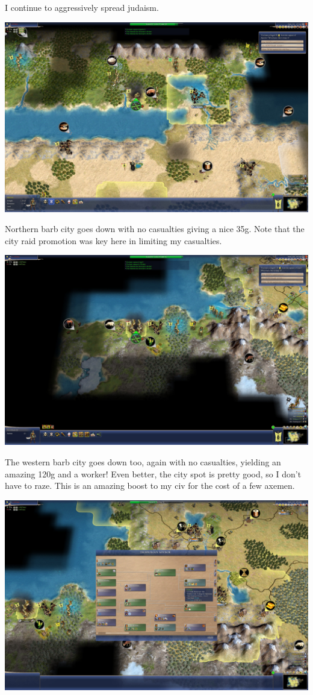 \documentclass[10pt]{article}
\begin{document}
I continue to aggressively spread judaism.

\includegraphics[width=1.0\textwidth]{97}

Northern barb city goes down with no casualties giving a nice 35g. Note that the city raid promotion was key here
in limiting my casualties.

\includegraphics[width=1.0\textwidth]{99}

The western barb city goes down too, again with no casualties, yielding an amazing 120g and a worker! Even better, the
city spot is pretty good, so I don't have to raze. This is an amazing boost to my civ for the cost of a few axemen.

\includegraphics[width=1.0\textwidth]{100}
\end{document}
